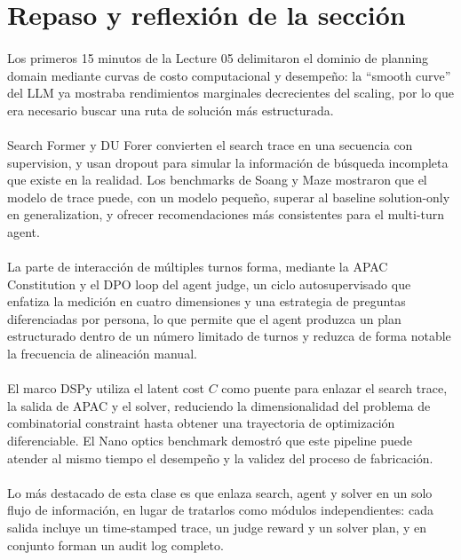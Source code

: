 \section{Repaso y reflexión de la sección}

\paragraph{}
Los primeros 15 minutos de la Lecture 05 delimitaron el dominio de planning domain mediante curvas de costo computacional y desempeño: la ``smooth curve'' del LLM ya mostraba rendimientos marginales decrecientes del scaling, por lo que era necesario buscar una ruta de solución más estructurada.

\paragraph{}
Search Former y DU Forer convierten el search trace en una secuencia con supervision, y usan dropout para simular la información de búsqueda incompleta que existe en la realidad. Los benchmarks de Soang y Maze mostraron que el modelo de trace puede, con un modelo pequeño, superar al baseline solution-only en generalization, y ofrecer recomendaciones más consistentes para el multi-turn agent.

\paragraph{}
La parte de interacción de múltiples turnos forma, mediante la APAC Constitution y el DPO loop del agent judge, un ciclo autosupervisado que enfatiza la medición en cuatro dimensiones y una estrategia de preguntas diferenciadas por persona, lo que permite que el agent produzca un plan estructurado dentro de un número limitado de turnos y reduzca de forma notable la frecuencia de alineación manual.

\paragraph{}
El marco DSPy utiliza el latent cost \(C\) como puente para enlazar el search trace, la salida de APAC y el solver, reduciendo la dimensionalidad del problema de combinatorial constraint hasta obtener una trayectoria de optimización diferenciable. El Nano optics benchmark demostró que este pipeline puede atender al mismo tiempo el desempeño y la validez del proceso de fabricación.

\paragraph{}
Lo más destacado de esta clase es que enlaza search, agent y solver en un solo flujo de información, en lugar de tratarlos como módulos independientes: cada salida incluye un time-stamped trace, un judge reward y un solver plan, y en conjunto forman un audit log completo.

